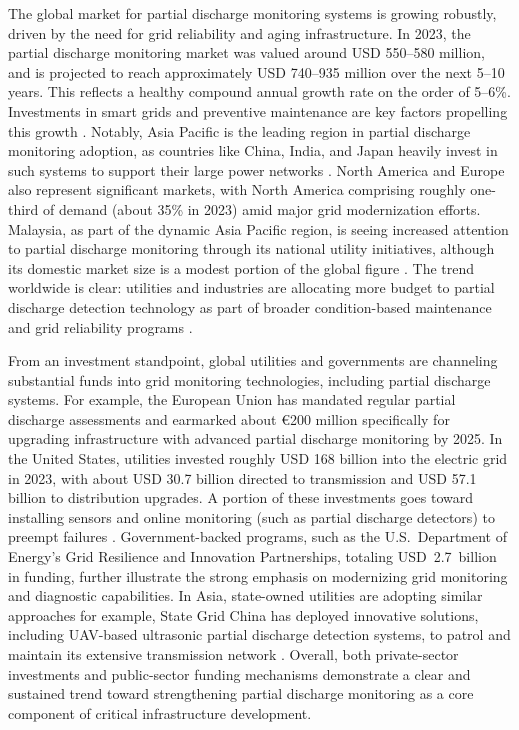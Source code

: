 The global market for partial discharge monitoring systems is growing robustly, driven by the need for grid reliability and aging infrastructure. In 2023, the partial discharge monitoring market was valued around USD 550–580 million, and is projected to reach approximately USD 740–935 million over the next 5–10 years. This reflects a healthy compound annual growth rate on the order of 5–6\%. Investments in smart grids and preventive maintenance are key factors propelling this growth \parencite{Jia_2020, Kim_2020}. Notably, Asia Pacific is the leading region in partial discharge monitoring adoption, as countries like China, India, and Japan heavily invest in such systems to support their large power networks \parencite{Song_2018, Abdullah_2019}. North America and Europe also represent significant markets, with North America comprising roughly one-third of demand (about 35\% in 2023) amid major grid modernization efforts. Malaysia, as part of the dynamic Asia Pacific region, is seeing increased attention to partial discharge monitoring through its national utility initiatives, although its domestic market size is a modest portion of the global figure \parencite{Chan_2023}. The trend worldwide is clear: utilities and industries are allocating more budget to partial discharge detection technology as part of broader condition-based maintenance and grid reliability programs \parencite{Sikorski_2020}.

From an investment standpoint, global utilities and governments are channeling substantial funds into grid monitoring technologies, including partial discharge systems. For example, the European Union has mandated regular partial discharge assessments and earmarked about €200 million specifically for upgrading infrastructure with advanced partial discharge monitoring by 2025. In the United States, utilities invested roughly USD 168 billion into the electric grid in 2023, with about USD 30.7 billion directed to transmission and USD 57.1 billion to distribution upgrades. A portion of these investments goes toward installing sensors and online monitoring (such as partial discharge detectors) to preempt failures \parencite{Liccardo_2022}. Government-backed programs, such as the U.S.\ Department of Energy’s Grid Resilience and Innovation Partnerships, totaling USD~2.7~billion in funding, further illustrate the strong emphasis on modernizing grid monitoring and diagnostic capabilities. In Asia, state-owned utilities are adopting similar approaches for example, State Grid China has deployed innovative solutions, including UAV-based ultrasonic partial discharge detection systems, to patrol and maintain its extensive transmission network \parencite{Kim_2020}. Overall, both private-sector investments and public-sector funding mechanisms demonstrate a clear and sustained trend toward strengthening partial discharge monitoring as a core component of critical infrastructure development.

